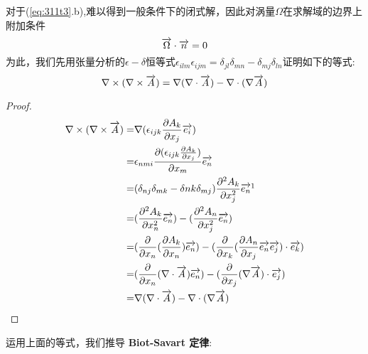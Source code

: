对于(\ref{eq:311t3}.b),难以得到一般条件下的闭式解，因此对涡量$\Omega$在求解域的边界上附加条件
\begin{equation}\label{eq:31supp}
\overrightarrow{\Omega}\cdot \overrightarrow{n}=0
\end{equation}
为此，我们先用张量分析的$\epsilon-\delta$恒等式$\epsilon_{ilm}\epsilon_{ijm}=\delta_{jl}\delta_{mn}-\delta_{mj}\delta_{ln}$证明如下的等式:
\begin{equation}\label{eq:312times}
\nabla \times(\nabla \times \overrightarrow{A})=\nabla(\nabla \cdot \overrightarrow{A})-\nabla\cdot(\nabla \overrightarrow{A})
\end{equation}
\begin{proof}
\begin{align*}
\nabla \times(\nabla \times \v{A}) =& \nabla (\epsilon_{ijk} \frac{\partial A_k}{\partial x_j} \v{e_i})\\
=&\epsilon_{nmi} \frac{\partial (\epsilon_{ijk} \frac{\partial A_k}{\partial x_j})}{\partial x_m} \v{e_n}\\
=&(\delta_{nj}\delta_{mk}-\delta{nk}\delta_{mj})\frac{\partial^2 A_k}{\partial x_j^2}\v{e_n}\footnotemark\\
=&(\frac{\partial^2 A_k}{\partial x_n^2}\v{e_n})-(\frac{\partial^2 A_n}{\partial x_j^2}\v{e_n})\\
=&(\frac{\partial}{\partial x_n}(\frac{\partial A_k}{\partial x_n})\v{e_n})-(\frac{\partial}{\partial x_k}(\frac{\partial A_n}{\partial x_j}\v{e_n}\v{e_j})\cdot \v{e_k})\\
=&(\frac{\partial}{\partial x_n}(\nabla\cdot \v{A})\v{e_n})-(\frac{\partial}{\partial x_j}(\nabla \v{A})\cdot \v{e_j})\\
=&\nabla(\nabla \cdot \v{A})-\nabla\cdot(\nabla \v{A})
\end{align*}
\end{proof}
运用上面的等式，我们推导 \textbf{Biot-Savart 定律}:

